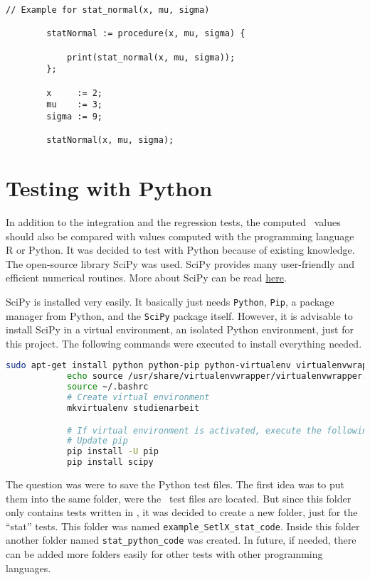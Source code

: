 	\begin{center}
		\begin{lstlisting}[caption={Regression Test Example}, language={setlx}, label={lis:regressionTestExample}]
		// Example for stat_normal(x, mu, sigma)

		statNormal := procedure(x, mu, sigma) {

			print(stat_normal(x, mu, sigma));
		};

		x     := 2;
		mu	  := 3;
		sigma := 9;

		statNormal(x, mu, sigma);
		\end{lstlisting}
	\end{center}


\section{Testing with Python}

	In addition to the integration and the regression tests, the computed \setlx\ values should also be compared with values computed with the programming language R or Python. It was decided to test with Python because of existing knowledge. The open-source library \ac{SciPy} was used. \ac{SciPy} provides many user-friendly and efficient numerical routines. More about \ac{SciPy} can be read \href{https://www.scipy.org/}{here}.

	\ac{SciPy} is installed very easily. It basically just needs \lstinline{Python}, \lstinline{Pip}, a package manager from Python, and the \lstinline{SciPy} package itself. However, it is advisable to install \ac{SciPy} in a virtual environment, an isolated Python environment, just for this project. The following commands were executed to install everything needed.

	\begin{center}
		\begin{lstlisting}[caption={Install Virtual Environment and SciPy}, language={bash}, label={lis:scipy}]
			sudo apt-get install python python-pip python-virtualenv virtualenvwrapper
			echo source /usr/share/virtualenvwrapper/virtualenvwrapper.sh >> ~/.bashrc
			source ~/.bashrc
			# Create virtual environment
			mkvirtualenv studienarbeit

			# If virtual environment is activated, execute the following:
			# Update pip
			pip install -U pip
			pip install scipy
		\end{lstlisting}
	\end{center}

	The question was were to save the Python test files. The first idea was to put them into the same folder, were the \setlx\ test files are located. But since this folder only contains tests written in \setlx, it was decided to create a new folder, just for the \enquote{stat} tests. This folder was named \lstinline{example_SetlX_stat_code}. Inside this folder another folder named \lstinline{stat_python_code} was created. In future, if needed, there can be added more folders easily for other tests with other programming languages.

